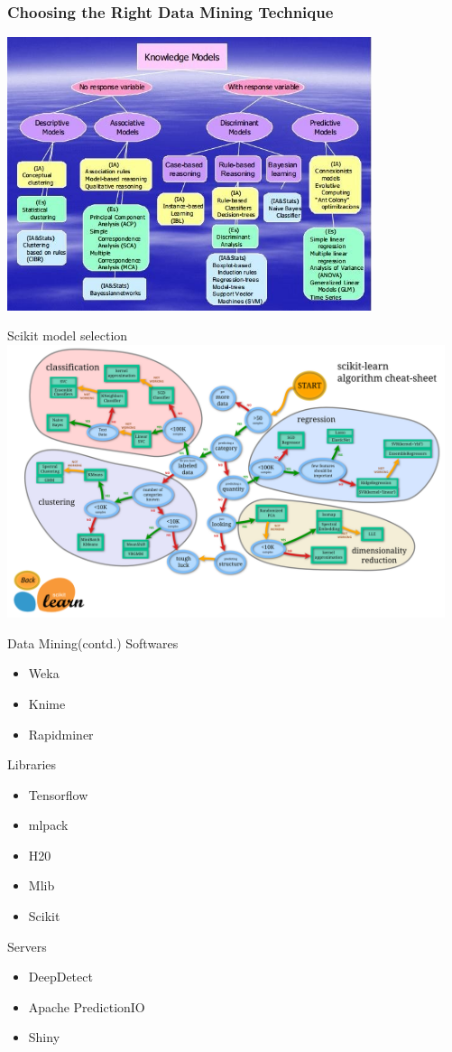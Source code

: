 \documentclass{beamer}
\begin{document}
\begingroup
\small
\begin{frame}
	\frametitle{Choosing the Right Data Mining Technique}
	\includegraphics[width=\columnwidth,height=8cm]{figures/selectionofdatamining.jpeg}
\end{frame}

\begin{frame}{Scikit model selection}
	\includegraphics[width=\columnwidth,height=8cm]{figures/scikitlearn.png}
\end{frame}
\endgroup


\begin{frame}{Data Mining(contd.)}
	Softwares
		\begin{itemize}
			\item Weka
			\item Knime
			\item Rapidminer
		\end{itemize}
	Libraries
		\begin{itemize}
			\item Tensorflow
			\item mlpack
			\item H20
			\item Mlib
			\item Scikit
		\end{itemize}
	Servers 
		\begin{itemize}
			\item DeepDetect
			\item Apache PredictionIO
			\item Shiny
		\end{itemize}
\end{frame}
\end{document}
